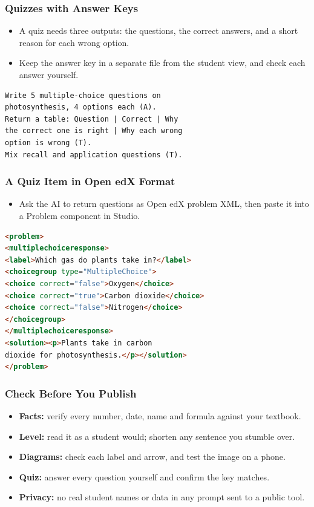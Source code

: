 \begin{frame}[fragile]\frametitle{Quizzes with Answer Keys}
\begin{itemize}
\item A quiz needs three outputs: the questions, the correct answers, and a short reason for each wrong option.
\item Keep the answer key in a separate file from the student view, and check each answer yourself.
\end{itemize}
\begin{lstlisting}[language=HTML]
Write 5 multiple-choice questions on
photosynthesis, 4 options each (A).
Return a table: Question | Correct | Why
the correct one is right | Why each wrong
option is wrong (T).
Mix recall and application questions (T).
\end{lstlisting}
\end{frame}

\begin{frame}[fragile]\frametitle{A Quiz Item in Open edX Format}
\begin{itemize}
\item Ask the AI to return questions as Open edX problem XML, then paste it into a Problem component in Studio.
\end{itemize}
\begin{lstlisting}[language=HTML]
<problem>
<multiplechoiceresponse>
<label>Which gas do plants take in?</label>
<choicegroup type="MultipleChoice">
<choice correct="false">Oxygen</choice>
<choice correct="true">Carbon dioxide</choice>
<choice correct="false">Nitrogen</choice>
</choicegroup>
</multiplechoiceresponse>
<solution><p>Plants take in carbon
dioxide for photosynthesis.</p></solution>
</problem>
\end{lstlisting}
\end{frame}

\begin{frame}[fragile]\frametitle{Check Before You Publish}
\begin{itemize}
\item \textbf{Facts:} verify every number, date, name and formula against your textbook.
\item \textbf{Level:} read it as a student would; shorten any sentence you stumble over.
\item \textbf{Diagrams:} check each label and arrow, and test the image on a phone.
\item \textbf{Quiz:} answer every question yourself and confirm the key matches.
\item \textbf{Privacy:} no real student names or data in any prompt sent to a public tool.
\end{itemize}
\end{frame}

